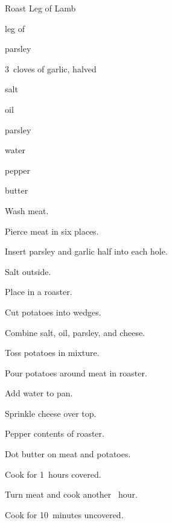 \begin{recipe}{Roast Leg of Lamb}{}{}

\begin{ingredients}
\item leg of 
\item parsley
\item 3~cloves of garlic, halved
\item salt
\item oil
\item parsley
\item {}
\item \C{\half} water
\item pepper
\item butter
\end{ingredients}

\begin{directions}
\item Wash meat.
\item Pierce meat in six places.
\item Insert parsley and garlic half into each hole.
\item Salt outside.
\item Place in a roaster.
\item Cut potatoes into wedges.
\item Combine salt, oil, parsley, and cheese.
\item Toss potatoes in mixture.
\item Pour potatoes around meat in roaster.
\item Add water to pan.
\item Sprinkle cheese over top.
\item Pepper contents of roaster.
\item Dot butter on meat and potatoes.
\item Cook for 1\half~hours covered.
\item Turn meat and cook another \half~hour.
\item Cook for 10~minutes uncovered.
\end{directions}

\end{recipe}
